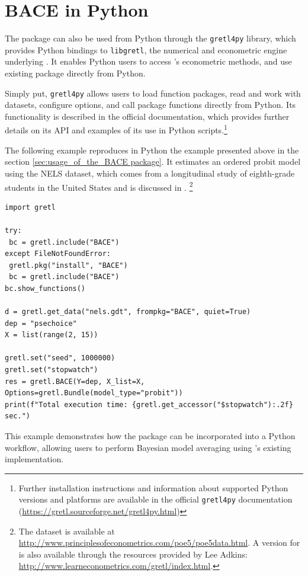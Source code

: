 \section{BACE in Python} 
The  package can also be used from Python 
through the \texttt{gretl4py} library, which provides Python 
bindings to \texttt{libgretl}, the numerical and econometric 
engine underlying . It enables Python users to access 
's econometric methods, and use existing  
package directly from Python. 

Simply put, \texttt{gretl4py} allows users to load  
function packages, read and work with datasets, configure 
 options, and call package functions directly from 
Python. Its functionality is described in the official documentation, 
which provides further details on its API and examples of its use 
in Python scripts.\footnote{
	Further installation instructions and information 
	about supported Python versions and platforms are 
	available in the official \texttt{gretl4py} 
	documentation (\url{https://gretl.sourceforge.net/gretl4py.html})}
	
The following example reproduces in Python the example 
presented above in the section \ref{sec:usage_of_the_BACE package}.
It estimates an 
		ordered probit model using the NELS dataset, which comes 
		from a longitudinal study of eighth-grade students in the 
		United States and is discussed in 
		\cite{HillGriffithsLim_principles_2017}.
		\footnote{The dataset 
	is available at \url{http://www.principlesofeconometrics.com/poe5/poe5data.html}. 
	A version for  is also available through the resources 
	provided by Lee Adkins: 
	\url{http://www.learneconometrics.com/gretl/index.html}.}
\begin{lstlisting}[style=pythonstylefoot]
import gretl

try:
 bc = gretl.include("BACE")
except FileNotFoundError:
 gretl.pkg("install", "BACE")
 bc = gretl.include("BACE")
bc.show_functions()

d = gretl.get_data("nels.gdt", frompkg="BACE", quiet=True)
dep = "psechoice"
X = list(range(2, 15))

gretl.set("seed", 1000000)
gretl.set("stopwatch")
res = gretl.BACE(Y=dep, X_list=X, Options=gretl.Bundle(model_type="probit"))
print(f"Total execution time: {gretl.get_accessor("$stopwatch"):.2f} sec.")
\end{lstlisting}
%

This example demonstrates how the  package can be incorporated into a Python workflow, allowing users to perform Bayesian model averaging using 's existing implementation.